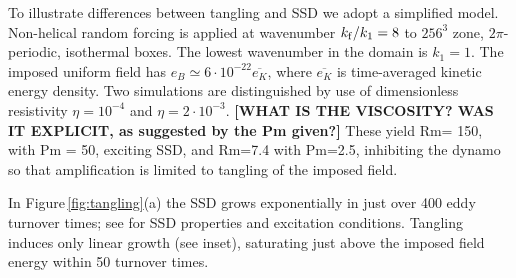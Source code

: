 \documentclass[preprint2]{aastex63}
\newcommand\kf{k_{\rm f} }
\begin{document}
 To illustrate differences between tangling and SSD we adopt a simplified
 model.
 Non-helical random forcing is applied at wavenumber $\kf/k_1=8$ to
 $256^3$ zone, $2\pi$-periodic, isothermal boxes.
The lowest wavenumber in the domain is $k_1=1$.
 The imposed uniform field has $e_B\simeq6\cdot10^{-22}\overline{e_K}$, where
 $\overline{e_K}$ is time-averaged kinetic energy density.
 Two simulations are distinguished by use of dimensionless
     resistivity
 $\eta=10^{-4}$
 and $\eta=2\cdot10^{-3}$.
 {\bf [WHAT IS THE VISCOSITY?  WAS IT EXPLICIT, as suggested by the Pm given?]}
 These yield Rm=
     150, with Pm = 50,
exciting SSD, and Rm=7.4 with Pm=2.5,
 inhibiting the dynamo so that amplification is limited to tangling of the imposed
 field.

 In Figure\,\ref{fig:tangling}(a) the SSD grows exponentially in just over 400
 eddy turnover times; see \cite{ZRS83} for SSD properties and excitation
 conditions.
 Tangling induces only linear growth (see inset), saturating just above
 the imposed field energy within 50 turnover times.
\end{document}

